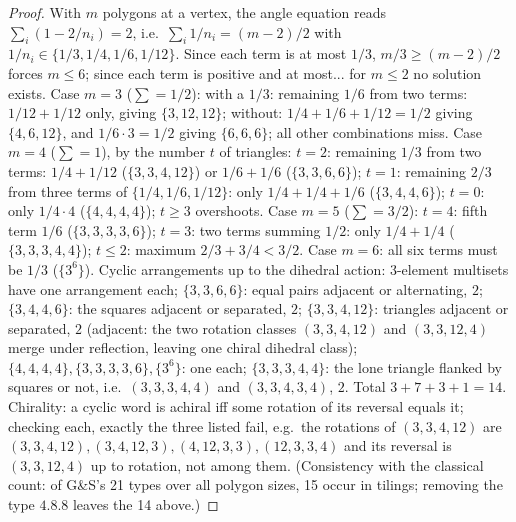 \documentclass[11pt]{article}
\theoremstyle{definition}
\begin{document}
\begin{proof}
With $m$ polygons at a vertex, the angle equation reads
$\sum_i (1 - 2/n_i) = 2$, i.e.\ $\sum_i 1/n_i = (m-2)/2$ with
$1/n_i \in \{1/3, 1/4, 1/6, 1/12\}$. Since each term is at most $1/3$, $m/3 \ge (m-2)/2$
forces $m \le 6$; since each term is positive and at most... for $m \le 2$ no solution
exists. Case $m=3$ ($\sum = 1/2$): with a $1/3$: remaining $1/6$ from two terms:
$1/12 + 1/12$ only, giving $\{3,12,12\}$; without: $1/4+1/6+1/12 = 1/2$ giving
$\{4,6,12\}$, and $1/6 \cdot 3 = 1/2$ giving $\{6,6,6\}$; all other combinations miss.
Case $m=4$ ($\sum = 1$), by the number $t$ of triangles: $t = 2$: remaining $1/3$ from
two terms: $1/4 + 1/12$ ($\{3,3,4,12\}$) or $1/6+1/6$ ($\{3,3,6,6\}$); $t = 1$: remaining
$2/3$ from three terms of $\{1/4,1/6,1/12\}$: only $1/4+1/4+1/6$ ($\{3,4,4,6\}$);
$t = 0$: only $1/4 \cdot 4$ ($\{4,4,4,4\}$); $t \ge 3$ overshoots. Case $m=5$
($\sum = 3/2$): $t = 4$: fifth term $1/6$ ($\{3,3,3,3,6\}$); $t = 3$: two terms summing
$1/2$: only $1/4+1/4$ ($\{3,3,3,4,4\}$); $t \le 2$: maximum $2/3 + 3/4 < 3/2$. Case
$m=6$: all six terms must be $1/3$ ($\{3^6\}$). Cyclic arrangements up to the dihedral
action: 3-element multisets have one arrangement each; $\{3,3,6,6\}$: equal pairs
adjacent or alternating, $2$; $\{3,4,4,6\}$: the squares adjacent or separated, $2$;
$\{3,3,4,12\}$: triangles adjacent or separated, $2$ (adjacent: the two rotation classes
$(3,3,4,12)$ and $(3,3,12,4)$ merge under reflection, leaving one chiral dihedral class);
$\{4,4,4,4\}, \{3,3,3,3,6\}, \{3^6\}$: one each; $\{3,3,3,4,4\}$: the lone triangle
flanked by squares or not, i.e.\ $(3,3,3,4,4)$ and $(3,3,4,3,4)$, $2$. Total
$3 + 7 + 3 + 1 = 14$. Chirality: a cyclic word is achiral iff some rotation of its
reversal equals it; checking each, exactly the three listed fail, e.g.\ the rotations of
$(3,3,4,12)$ are $(3,3,4,12), (3,4,12,3), (4,12,3,3), (12,3,3,4)$ and its reversal is
$(3,3,12,4)$ up to rotation, not among them. (Consistency with the classical count: of
G\&S's 21 types over all polygon sizes, 15 occur in tilings; removing the type $4.8.8$
leaves the 14 above.)
\end{proof}
\end{document}
